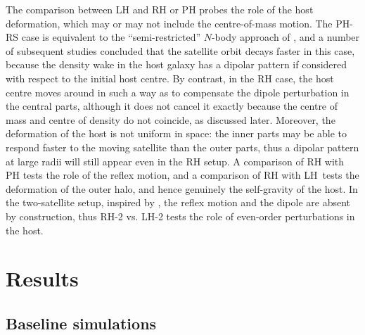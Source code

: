 \documentclass[twocolumn]{aastex63}
\newcommand{\LH}{\textsf{L\!H}\xspace}
\newcommand{\RH}{\textsf{R\!H}\xspace}
\newcommand{\PH}{\textsf{P\!H}\xspace}
\newcommand{\RS}{\textsf{R\!S}\xspace}
\begin{document}
The comparison between \LH and \RH or \PH probes the role of the host deformation, which may or may not include the centre-of-mass motion. The \PH-\RS case is equivalent to the ``semi-restricted'' $N$-body approach of \citet{Lin1983}, and a number of subsequent studies \citep{White1983, Bontekoe1987, Cora1997} concluded that the satellite orbit decays faster in this case, because the density wake in the host galaxy has a dipolar pattern if considered with respect to the initial host centre. By contrast, in the \RH case, the host centre moves around in such a way as to compensate the dipole perturbation in the central parts, although it does not cancel it exactly because the centre of mass and centre of density do not coincide, as discussed later. Moreover, the deformation of the host is not uniform in space: the inner parts may be able to respond faster to the moving satellite than the outer parts, thus a dipolar pattern at large radii will still appear even in the \RH setup. A comparison of \RH with \PH tests the role of the reflex motion, and a comparison of \RH with \LH\ tests the deformation of the outer halo, and hence genuinely the self-gravity of the host. In the two-satellite setup, inspired by \citet{Hernquist1989}, the reflex motion and the dipole are absent by construction, thus \RH-2 vs. \LH-2 tests the role of even-order perturbations in the host.


\section{Results}   \label{sec:results}

\subsection{Baseline simulations}   \label{sec:baseline}
\end{document}
